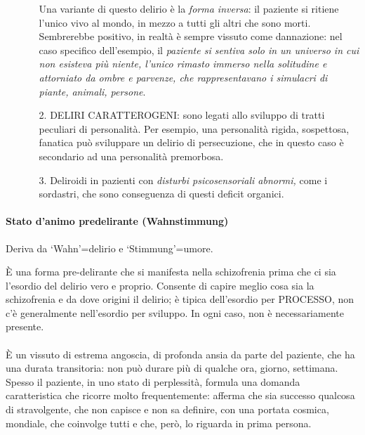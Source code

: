 \begin{itemize}
\begin{itemize}
  Una variante di questo delirio è la \emph{forma inversa}: il paziente
  si ritiene l'unico vivo al mondo, in mezzo a tutti gli altri che sono
  morti. Sembrerebbe positivo, in realtà è sempre vissuto come
  dannazione: nel caso specifico dell'esempio, il \emph{paziente si
  sentiva solo in un universo in cui non esisteva più niente, l'unico
  rimasto immerso nella solitudine e attorniato da ombre e parvenze, che
  rappresentavano i simulacri di piante, animali, persone}.
\item[2.]
  DELIRI CARATTEROGENI: sono legati allo sviluppo di tratti peculiari di
  personalità. Per esempio, una personalità rigida, sospettosa, fanatica
  può sviluppare un delirio di persecuzione, che in questo caso è
  secondario ad una personalità premorbosa.
\item[3.]
  Deliroidi in pazienti con \emph{disturbi psicosensoriali abnormi,}
  come i sordastri, che sono conseguenza di questi deficit organici.
\end{itemize}

\end{itemize}

\paragraph{Stato d'animo predelirante (Wahnstimmung)}

Deriva da `Wahn'=delirio e `Stimmung'=umore.

È una forma pre-delirante che si manifesta nella schizofrenia prima che
ci sia l'esordio del delirio vero e proprio. Consente di capire meglio
cosa sia la schizofrenia e da dove origini il delirio; è tipica
dell'esordio per PROCESSO, non c'è generalmente nell'esordio per
sviluppo. In ogni caso, non è necessariamente presente.
\\\\
È un vissuto di estrema angoscia, di profonda ansia da parte del
paziente, che ha una durata transitoria: non può durare più di qualche
ora, giorno, settimana. Spesso il paziente, in uno stato di perplessità,
formula una domanda caratteristica che ricorre molto frequentemente:
afferma che sia successo qualcosa di stravolgente, che non capisce e non
sa definire, con una portata cosmica, mondiale, che coinvolge tutti e
che, però, lo riguarda in prima persona.

